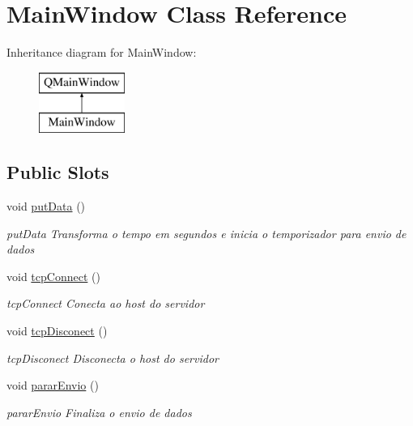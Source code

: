 \hypertarget{class_main_window}{}\section{Main\+Window Class Reference}
\label{class_main_window}
Inheritance diagram for Main\+Window\+:\begin{figure}[H]
\begin{center}
\leavevmode
\includegraphics[height=2.000000cm]{class_main_window}
\end{center}
\end{figure}
\subsection*{Public Slots}
\begin{DoxyCompactItemize}
\item 
\mbox{\label{class_main_window_afdfeb13ec363b0eb8ecacaf0aa13b605}} 
void \mbox{\hyperlink{class_main_window_afdfeb13ec363b0eb8ecacaf0aa13b605}{put\+Data}} ()
\begin{DoxyCompactList}\small\item\em put\+Data Transforma o tempo em segundos e inicia o temporizador para envio de dados \end{DoxyCompactList}\item 
\mbox{\label{class_main_window_ac5b669957c442b6eb68573dacfce33e1}} 
void \mbox{\hyperlink{class_main_window_ac5b669957c442b6eb68573dacfce33e1}{tcp\+Connect}} ()
\begin{DoxyCompactList}\small\item\em tcp\+Connect Conecta ao host do servidor \end{DoxyCompactList}\item 
\mbox{\label{class_main_window_acb6e44504f4c992e0fbefd6069f51bf7}} 
void \mbox{\hyperlink{class_main_window_acb6e44504f4c992e0fbefd6069f51bf7}{tcp\+Disconect}} ()
\begin{DoxyCompactList}\small\item\em tcp\+Disconect Disconecta o host do servidor \end{DoxyCompactList}\item 
\mbox{\label{class_main_window_a15cb3a5fca1f5db1ffaa48719a4c8bfe}} 
void \mbox{\hyperlink{class_main_window_a15cb3a5fca1f5db1ffaa48719a4c8bfe}{parar\+Envio}} ()
\begin{DoxyCompactList}\small\item\em parar\+Envio Finaliza o envio de dados \end{DoxyCompactList}\end{DoxyCompactItemize}
